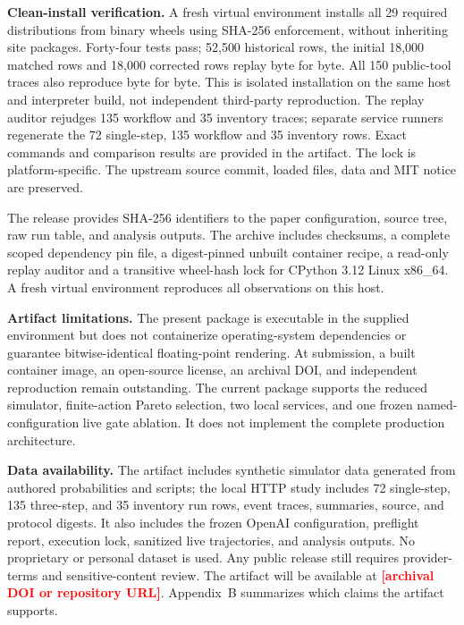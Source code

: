 \documentclass[10pt,journal,compsoc]{IEEEtran}
\DeclareRobustCommand{\fillin}[1]{\textcolor{red}{\textbf{[#1]}}}
\begin{document}
\textbf{Clean-install verification.} A fresh virtual environment installs all 29 required distributions from binary wheels using SHA-256 enforcement, without inheriting site packages. Forty-four tests pass; 52,500 historical rows, the initial 18,000 matched rows and 18,000 corrected rows replay byte for byte. All 150 public-tool traces also reproduce byte for byte. This is isolated installation on the same host and interpreter build, not independent third-party reproduction. The replay auditor rejudges 135 workflow and 35 inventory traces; separate service runners regenerate the 72 single-step, 135 workflow and 35 inventory rows. Exact commands and comparison results are provided in the artifact. The lock is platform-specific. The upstream source commit, loaded files, data and MIT notice are preserved.

The release provides SHA-256 identifiers to the paper configuration, source tree, raw run table, and analysis outputs. The archive includes checksums, a complete scoped dependency pin file, a digest-pinned unbuilt container recipe, a read-only replay auditor and a transitive wheel-hash lock for CPython 3.12 Linux x86\_64. A fresh virtual environment reproduces all observations on this host.

\textbf{Artifact limitations.} The present package is executable in the supplied environment but does not containerize operating-system dependencies or guarantee bitwise-identical floating-point rendering. At submission, a built container image, an open-source license, an archival DOI, and independent reproduction remain outstanding. The current package supports the reduced simulator, finite-action Pareto selection, two local services, and one frozen named-configuration live gate ablation. It does not implement the complete production architecture.

\textbf{Data availability.} The artifact includes synthetic simulator data generated from authored probabilities and scripts; the local HTTP study includes 72 single-step, 135 three-step, and 35 inventory run rows, event traces, summaries, source, and protocol digests. It also includes the frozen OpenAI configuration, preflight report, execution lock, sanitized live trajectories, and analysis outputs. No proprietary or personal dataset is used. Any public release still requires provider-terms and sensitive-content review. The artifact will be available at \fillin{archival DOI or repository URL}. Appendix~B summarizes which claims the artifact supports.

\end{document}
